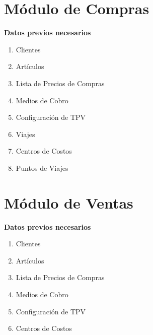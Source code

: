 \documentclass[letterpaper,10pt,spanish]{sphinxmanual}
\begin{document}
\chapter{Módulo de Compras}
\label{compras::doc}\label{compras:modulo-de-compras}
\textbf{Datos previos necesarios}
\begin{enumerate}
\item {} 
Clientes

\item {} 
Artículos

\item {} 
Lista de Precios de Compras

\item {} 
Medios de Cobro

\item {} 
Configuración de TPV

\item {} 
Viajes

\item {} 
Centros de Costos

\item {} 
Puntos de Viajes

\end{enumerate}


\chapter{Módulo de Ventas}
\label{ventas:modulo-de-ventas}\label{ventas::doc}
\textbf{Datos previos necesarios}
\begin{enumerate}
\item {} 
Clientes

\item {} 
Artículos

\item {} 
Lista de Precios de Compras

\item {} 
Medios de Cobro

\item {} 
Configuración de TPV

\item {} 
Centros de Costos

\end{enumerate}
\end{document}
